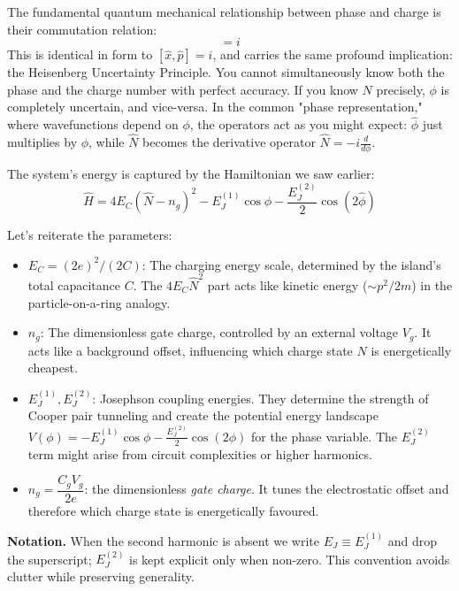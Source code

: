 \documentclass{book}
\begin{document}
The fundamental quantum mechanical relationship between phase and charge is their commutation relation:
\begin{equation}
[\hat{\phi}, \hat{N}] = i 
\label{eq:commutator}
\end{equation}
This is identical in form to \([\hat{x}, \hat{p}] = i\), and carries the same profound implication: the Heisenberg Uncertainty Principle. You cannot simultaneously know both the phase and the charge number with perfect accuracy. If you know \(N\) precisely, \(\phi\) is completely uncertain, and vice-versa. In the common "phase representation," where wavefunctions depend on \(\phi\), the operators act as you might expect: \(\hat{\phi}\) just multiplies by \(\phi\), while \(\hat{N}\) becomes the derivative operator \(\hat{N} = -i \frac{d}{d\phi}\).

The system's energy is captured by the Hamiltonian we saw earlier:
\begin{equation}
\hat{H} = 4 E_C (\hat{N} - n_g)^2 - E_J^{(1)} \cos \hat{\phi} - \frac{E_J^{(2)}}{2} \cos (2 \hat{\phi})
\label{eq:hamiltonian}
\end{equation}

Let's reiterate the parameters:
\begin{itemize}
    \item \(E_C = (2e)^2 / (2C)\): The charging energy scale, determined by the island's total capacitance \(C\). The \(4 E_C \hat{N}^2\) part acts like kinetic energy (\(\sim p^2/2m\)) in the particle-on-a-ring analogy.
    \item \(n_g\): The dimensionless gate charge, controlled by an external voltage \(V_g\). It acts like a background offset, influencing which charge state \(N\) is energetically cheapest.
    \item \(E_J^{(1)}, E_J^{(2)}\): Josephson coupling energies. They determine the strength of Cooper pair tunneling and create the potential energy landscape \(V(\phi) = -E_J^{(1)} \cos \phi - \frac{E_J^{(2)}}{2} \cos (2 \phi)\) for the phase variable. The \(E_J^{(2)}\) term might arise from circuit complexities or higher harmonics.
    \item \(n_g = \dfrac{C_g V_g}{2e}\): the dimensionless \emph{gate charge}.  
    It tunes the electrostatic offset and therefore which charge state is
    energetically favoured.

\end{itemize}
\medskip
\noindent\textbf{Notation.}  
When the second harmonic is absent we write $E_J\equiv E_J^{(1)}$ and drop
the superscript; $E_J^{(2)}$ is kept explicit only when non-zero.  This
convention avoids clutter while preserving generality.
\end{document}

